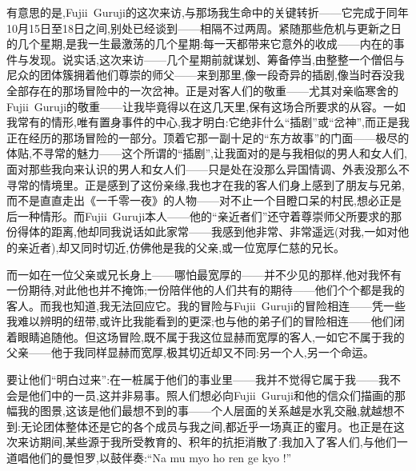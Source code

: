有意思的是,Fujii~Guruji的这次来访,与那场我生命中的关键转折——它完成于同年10月15日至18日之间,别处已经谈到——相隔不过两周。紧随那些危机与更新之日的几个星期,是我一生最激荡的几个星期:每一天都带来它意外的收成——内在的事件与发现。说实话,这次来访——几个星期前就谋划、筹备停当,由整整一个僧侣与尼众的团体簇拥着他们尊崇的师父——来到那里,像一段奇异的插剧,像当时吞没我全部存在的那场冒险中的一次岔神。正是对客人们的敬重——尤其对亲临寒舍的Fujii~Guruji的敬重——让我毕竟得以在这几天里,保有这场合所要求的从容。一如我常有的情形,唯有置身事件的中心,我才明白:它绝非什么“插剧”或“岔神”,而\dmark{}正是我正在经历的那场冒险的一部分。顶着它那一副十足的“东方故事”的门面——极尽的体贴,不寻常的魅力——这个所谓的“插剧”,让我面对的是与我相似的男人和女人们,面对那些我向来认识的男人和女人们——只是处在没那么异国情调、外表没那么不寻常的情境里。正是感到了这份亲缘,我也才在我的客人们身上感到了朋友与兄弟,而不是直直走出《一千零一夜》的人物——对不止一个目瞪口呆的村民,想必正是后一种情形。而Fujii~Guruji本人——他的“亲近者们”还守着尊崇师父所要求的那份得体的距离,他却同我说话如此家常——我感到他非常、非常遥远(对我,一如对他的亲近者),却又同时切近,仿佛他是我的父亲,或一位宽厚仁慈的兄长。

而一如在一位父亲或兄长身上——哪怕最宽厚的——并不少见的那样,他对我怀有一份期待,对此他也并不掩饰;一份陪伴他的人们共有的期待——他们个个都是我的客人。而我也知道,我无法回应它。我的冒险与Fujii~Guruji的冒险相连——凭一些我难以辨明的纽带,或许比我能看到的更深;也与他的弟子们的冒险相连——他们闭着眼睛追随他。但这场冒险,既不属于我这位显赫而宽厚的客人,一如它不属于我的父亲——他于我同样显赫而宽厚,极其切近却又不同:另一个人,另一个命运。

要让他们“明白过来”:在一桩属于他们的事业里——我并不觉得它属于我——我不会是他们中的一员,这并非易事。照人们想必向Fujii~Guruji和他的信众们描画的那幅我的图景,这该是他们最想不到的事——个人层面的关系越是水乳交融,就越想不到:无论团体整体还是它的各个成员与我之间,都近乎一场真正的蜜月。也正是在这次来访期间,某些源于我所受教育的、积年的抗拒消散了:我加入了客人们,与他们一道唱他们的曼怛罗,以鼓伴奏:“Na mu myo ho ren ge kyo !”

